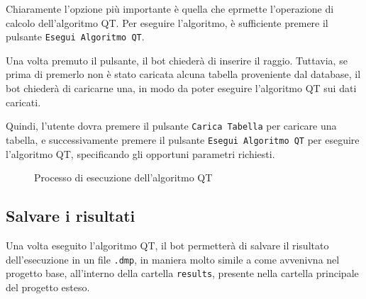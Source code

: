 Chiaramente l'opzione più importante è quella che eprmette l'operazione di calcolo dell'algoritmo QT. Per eseguire l'algoritmo, è sufficiente premere il pulsante \texttt{Esegui Algoritmo QT}. 


Una volta premuto il pulsante, il bot chiederà di inserire il raggio. Tuttavia, se prima di premerlo non è stato caricata alcuna tabella proveniente dal database, il bot chiederà di caricarne una, in modo da poter eseguire l'algoritmo QT sui dati caricati.

Quindi, l'utente dovra premere il pulsante \texttt{Carica Tabella} per caricare una tabella, e successivamente premere il pulsante \texttt{Esegui Algoritmo QT} per eseguire l'algoritmo QT, specificando gli opportuni parametri richiesti.

\begin{figure}[h!]
    \centering
    \hfill
    \caption{Processo di esecuzione dell'algoritmo QT}
\end{figure}

\subsection{Salvare i risultati}

Una volta eseguito l'algoritmo QT, il bot permetterà di salvare il risultato dell'esecuzione in un file \texttt{.dmp}, in maniera molto simile a come avvenivna nel progetto base, all'interno della cartella \texttt{results}, presente nella cartella principale del progetto esteso. 

